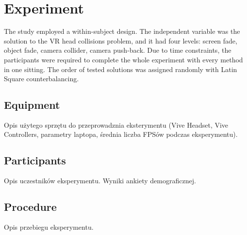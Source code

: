 \section{Experiment}

The study employed a within-subject design. The independent variable was the solution to the VR head collisions problem, and it had four levels: screen fade, object fade, camera collider, camera push-back. Due to time constraints, the participants were required to complete the whole experiment with every method in one sitting. The order of tested solutions was assigned randomly with Latin Square counterbalancing. 

\subsection{Equipment}

Opis użytego sprzętu do przeprowadznia eksterymentu (Vive Headset, Vive Controllers, parametry laptopa, średnia liczba FPSów podczas eksperymentu).

\subsection{Participants}

Opis uczestników eksperymentu. Wyniki ankiety demograficznej.

\subsection{Procedure}

Opis przebiegu eksperymentu.